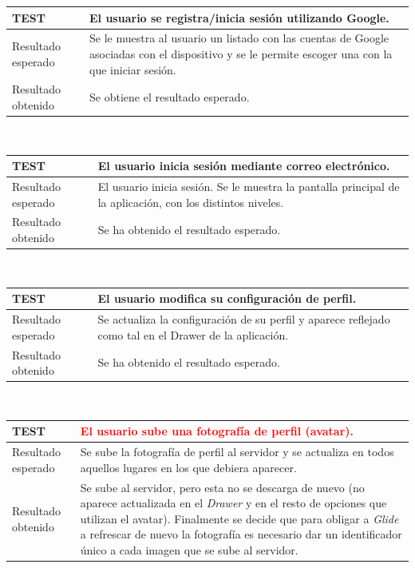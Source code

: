 \documentclass[twoside]{report}
\newcommand\addrow[2]{#1 &#2\\ }
\newcommand\addheading[2]{#1 &#2\\ \hline}
\newcommand\tabularhead{\begin{tabular}{lp{0.7\textwidth}}
\hline
}
\newenvironment{test}{\tabularhead}
{\hline\end{tabular}}
\begin{document}
\vspace{0.5cm}

\begin{test}
  \addheading{\textbf{TEST\arabic{test}}}{El usuario se registra/inicia sesión utilizando Google.}
  \addrow{Resultado esperado}{Se le muestra al usuario un listado con las cuentas de Google asociadas con el dispositivo y se le permite escoger una con la que iniciar sesión.}
   \addrow{Resultado obtenido}{Se obtiene el resultado esperado.}
\end{test}\\

\vspace{0.5cm}

\begin{test}
  \addheading{\textbf{TEST\arabic{test}}}{El usuario inicia sesión mediante correo electrónico.} 
  \addrow{Resultado esperado}{El usuario inicia sesión. Se le muestra la pantalla principal de la aplicación, con los distintos niveles.}
  \addrow{Resultado obtenido}{Se ha obtenido el resultado esperado.}
\end{test}\\

\vspace{0.5cm}

\begin{test}
  \addheading{\textbf{TEST\arabic{test}}}{El usuario modifica su configuración de perfil.} 
  \addrow{Resultado esperado}{Se actualiza la configuración de su perfil y aparece reflejado como tal en el Drawer de la aplicación.}
  \addrow{Resultado obtenido}{Se ha obtenido el resultado esperado.}
\end{test}\\

\vspace{0.5cm}

\begin{test}
  \addheading{\textbf{TEST\arabic{test}}}{\textcolor{red}{El usuario sube una fotografía de perfil (avatar).}} 
  \addrow{Resultado esperado}{Se sube la fotografía de perfil al servidor y se actualiza en todos aquellos lugares en los que debiera aparecer.}
  \addrow{Resultado obtenido}{Se sube al servidor, pero esta no se descarga de nuevo (no aparece actualizada en el \textit{Drawer} y en el resto de opciones que utilizan el avatar). Finalmente se decide que para obligar a \textit{Glide} a refrescar de nuevo la fotografía es necesario dar un identificador único a cada imagen que se sube al servidor.}
\end{test}\\
\end{document}
